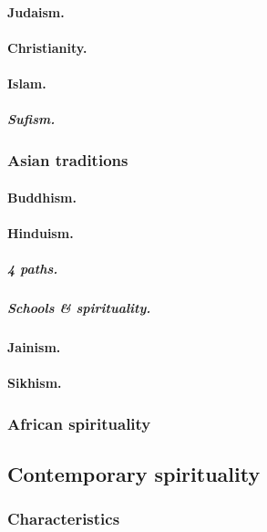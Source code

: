 \documentclass[oneside]{book}
\numberwithin{equation}{section}
\begin{document}
\paragraph{Judaism.}

\paragraph{Christianity.}

\paragraph{Islam.}

\subparagraph{Sufism.}

\subsubsection{Asian traditions}

\paragraph{Buddhism.}

\paragraph{Hinduism.}

\subparagraph{4 paths.}

\subparagraph{Schools \& spirituality.}

\paragraph{Jainism.}

\paragraph{Sikhism.}

\subsubsection{African spirituality}

\subsection{Contemporary spirituality}

\subsubsection{Characteristics}
\end{document}
